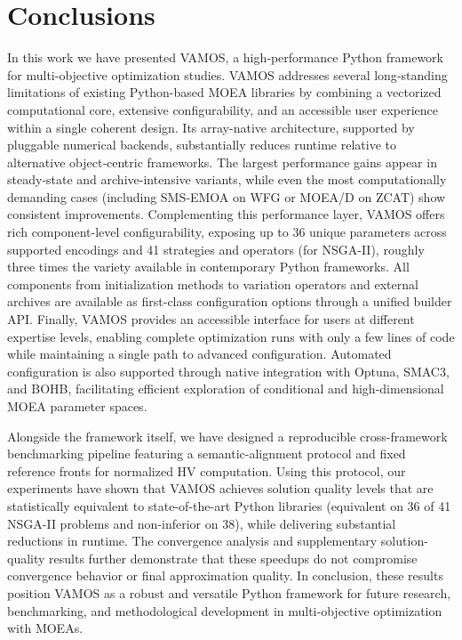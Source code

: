 \documentclass[final,5p,times,twocolumn]{elsarticle}
\newcommand{\VAMOS}{VAMOS}
\begin{document}
\section{Conclusions}
\label{sec:conclusions}

In this work we have presented \VAMOS{}, a high‑performance Python framework for multi-objective optimization studies. \VAMOS{} addresses several long‑standing limitations of existing Python-based MOEA libraries by combining a vectorized computational core, extensive configurability, and an accessible user experience within a single coherent design. Its array-native architecture, supported by pluggable numerical backends, substantially reduces runtime relative to alternative object‑centric frameworks. The largest performance gains appear in steady‑state and archive-intensive variants, while even the most computationally demanding cases (including SMS‑EMOA on WFG or MOEA/D on ZCAT) show consistent improvements. Complementing this performance layer, \VAMOS{} offers rich component-level configurability, exposing up to 36 unique parameters across supported encodings and 41 strategies and operators (for NSGA-II), roughly three times the variety available in contemporary Python frameworks. All components from initialization methods to variation operators and external archives are available as first-class configuration options through a unified builder API. Finally, \VAMOS{} provides an accessible interface for users at different expertise levels, enabling complete optimization runs with only a few lines of code while maintaining a single path to advanced configuration. Automated configuration is also supported through native integration with Optuna, SMAC3, and BOHB, facilitating efficient exploration of conditional and high-dimensional MOEA parameter spaces.

Alongside the framework itself, we have designed a reproducible cross-framework benchmarking pipeline featuring a semantic-alignment protocol and fixed reference fronts for normalized HV computation. Using this protocol, our experiments have shown that \VAMOS{} achieves solution quality levels that are statistically equivalent to state-of-the-art Python libraries (equivalent on 36 of 41 NSGA-II problems and non-inferior on 38), while delivering substantial reductions in runtime.  The convergence analysis and supplementary solution-quality results further demonstrate that these speedups do not compromise convergence behavior or final approximation quality. In conclusion, these results position \VAMOS{} as a robust and versatile Python framework for future research, benchmarking, and methodological development in multi-objective optimization with MOEAs.
\end{document}
